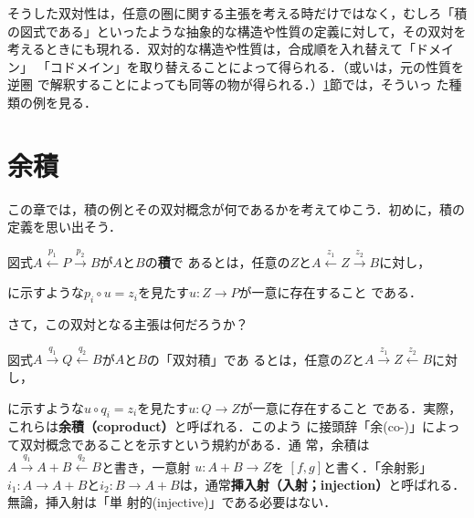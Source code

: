 そうした双対性は，任意の圏に関する主張を考える時だけではなく，むしろ「積
の図式である」といったような抽象的な構造や性質の定義に対して，その双対を
考えるときにも現れる．双対的な構造や性質は，合成順を入れ替えて「ドメイン」
「コドメイン」を取り替えることによって得られる．（或いは，元の性質を逆圏
で解釈することによっても同等の物が得られる．）\ref{余積}節では，そういっ
た種類の例を見る．
\section{余積}
\label{余積}
この章では，積の例とその双対概念が何であるかを考えてゆこう．初めに，積の
定義を思い出そう．
\begin{definition}
 図式$A \xleftarrow{p_1} P \xrightarrow{p_2} B$が$A$と$B$の{\bfseries 積}で
 あるとは，任意の$Z$と$A \xleftarrow{z_1} Z \xrightarrow{z_2} B$に対し，
 \begin{center}
 \end{center}
 に示すような$p_i \circ u = z_i$を見たす$u: Z \to P$が一意に存在すること
 である．
\end{definition}

さて，この双対となる主張は何だろうか？

図式$A \xrightarrow{q_1} Q \xleftarrow{q_2} B$が$A$と$B$の「双対積」であ
るとは，任意の$Z$と$A \xrightarrow{z_1} Z \xleftarrow{z_2} B$に対し，
\begin{center}
\end{center}
に示すような$u \circ q_i = z_i$を見たす$u: Q \to Z$が一意に存在すること
である．実際，これらは{\bfseries 余積（coproduct）}と呼ばれる．このよう
に接頭辞「余(co-)」によって双対概念であることを示すという規約がある．通
常，余積は $A \xrightarrow{q_1} A+B \xleftarrow{q_2} B$と書き，一意射
$u: A+B \to Z$を $[f, g]$と書く．「余射影」$i_1: A \to A+B$と$i_2: B \to
A + B$は，通常{\bfseries 挿入射（入射；injection）}と呼ばれる．無論，挿入射は「単
射的(injective)」である必要はない．

